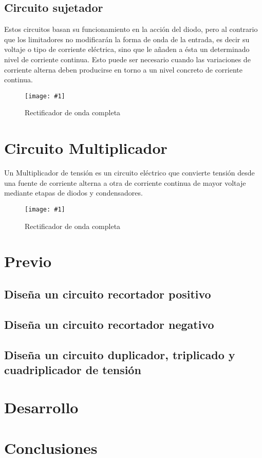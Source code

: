 \documentclass{mylib/reporteConCalif}
\newcommand{\insertImage}[3]{
	\begin{figure}[H]
		\centering
		\texttt{[image: \#1]}
		\caption{#2}
	\end{figure}
}
\begin{document}
\subsection{Circuito sujetador}

Estos circuitos basan su funcionamiento en la acción del diodo, pero al contrario que los limitadores no modificarán la forma de onda de la entrada, es decir su voltaje o tipo de corriente eléctrica, sino que le añaden a ésta un determinado nivel de corriente continua. Esto puede ser necesario cuando las variaciones de corriente alterna deben producirse en torno a un nivel concreto de corriente continua.

\insertImage{img/labdisp_pract5/suj}{Rectificador de onda completa}{8}

\section{Circuito Multiplicador}

Un Multiplicador de tensión es un circuito eléctrico que convierte tensión desde una fuente de corriente alterna a otra de corriente continua de mayor voltaje mediante etapas de diodos y condensadores.

\insertImage{img/labdisp_pract5/mult}{Rectificador de onda completa}{8}


\newpage
\section{Previo}

\subsection{Diseña un circuito recortador positivo}

\subsection{Diseña un circuito recortador negativo}

\subsection{Diseña un circuito duplicador, triplicado y cuadriplicador de tensión}

\newpage
\section{Desarrollo}


\section{Conclusiones}
\end{document}
